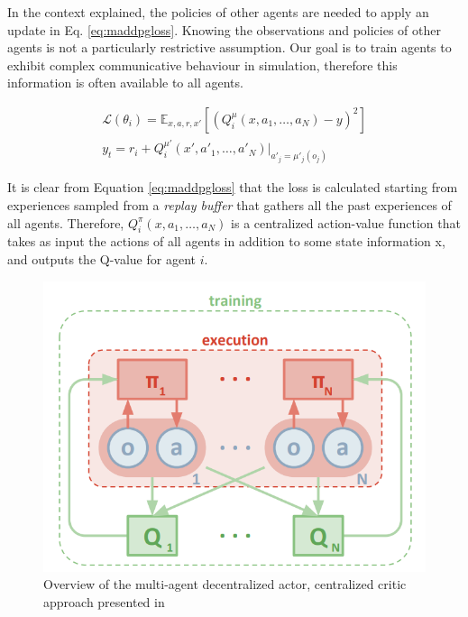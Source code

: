 \documentclass[letterpaper]{article}
\begin{document}
In the context explained, the policies of other agents are needed to apply an update in Eq. \ref{eq:maddpgloss}. Knowing the observations
and policies of other agents is not a particularly restrictive assumption. Our goal is to train agents to exhibit complex communicative behaviour in simulation, therefore this information is often available to all
agents.

\begin{equation}\label{eq:maddpgloss}
	\begin{gathered}
		\mathcal{L}(\theta_i) = \mathbb{E}_{x,a,r,x'}[(Q_i^{\mu}(x,a_1, \dots,a_N)-y)^2] \\
		y_t = r_i + Q_i^{\mu'}(x',a'_1, \dots,a'_N)|_{a'_j=\mu'_j(o_j)}
	\end{gathered}
\end{equation}

It is clear from Equation \ref{eq:maddpgloss} that the loss is calculated starting from experiences sampled from a \textit{replay buffer} that gathers all the past experiences of all agents. Therefore, $Q_i^\pi(x,a_1, \dots,a_N)$ is a centralized action-value function that takes as input the actions of all agents in addition to some state information x, and outputs the Q-value for agent $i$.

\begin{figure}[h!]\includegraphics[width=\linewidth]{img/maddpg.png}
\caption{Overview of the multi-agent decentralized actor, centralized critic approach presented in \cite{lowe2017multi} \label{fig:maddpg}}
\end{figure}   
\end{document}

